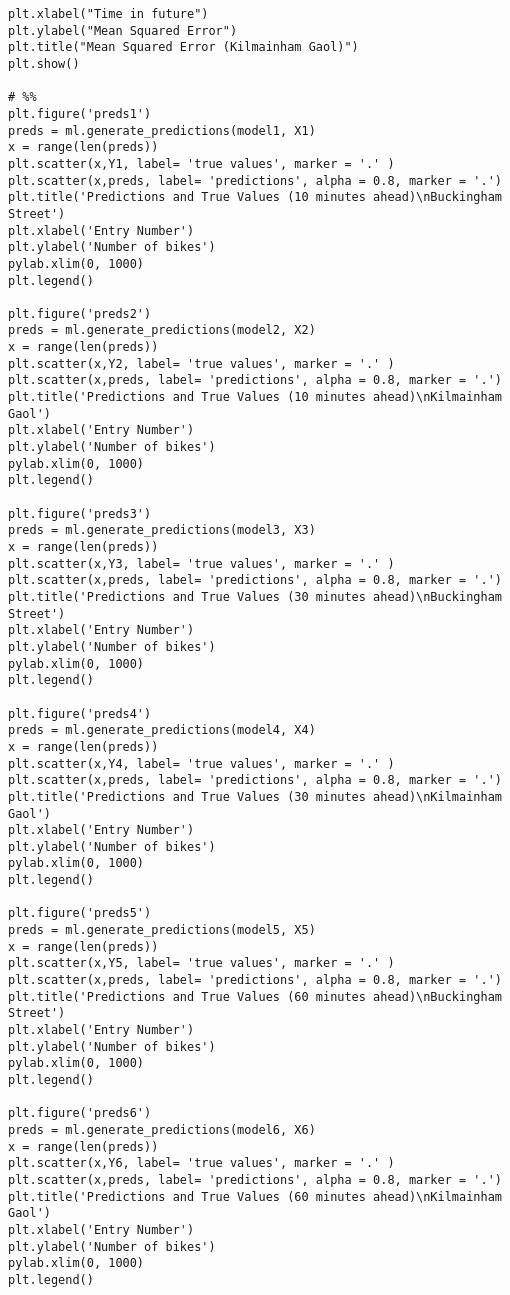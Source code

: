 \begin{verbatim}
plt.xlabel("Time in future")
plt.ylabel("Mean Squared Error")
plt.title("Mean Squared Error (Kilmainham Gaol)")
plt.show()

# %%
plt.figure('preds1')
preds = ml.generate_predictions(model1, X1)
x = range(len(preds))
plt.scatter(x,Y1, label= 'true values', marker = '.' )
plt.scatter(x,preds, label= 'predictions', alpha = 0.8, marker = '.')
plt.title('Predictions and True Values (10 minutes ahead)\nBuckingham Street')
plt.xlabel('Entry Number')
plt.ylabel('Number of bikes')
pylab.xlim(0, 1000)
plt.legend()

plt.figure('preds2')
preds = ml.generate_predictions(model2, X2)
x = range(len(preds))
plt.scatter(x,Y2, label= 'true values', marker = '.' )
plt.scatter(x,preds, label= 'predictions', alpha = 0.8, marker = '.')
plt.title('Predictions and True Values (10 minutes ahead)\nKilmainham Gaol')
plt.xlabel('Entry Number')
plt.ylabel('Number of bikes')
pylab.xlim(0, 1000)
plt.legend()

plt.figure('preds3')
preds = ml.generate_predictions(model3, X3)
x = range(len(preds))
plt.scatter(x,Y3, label= 'true values', marker = '.' )
plt.scatter(x,preds, label= 'predictions', alpha = 0.8, marker = '.')
plt.title('Predictions and True Values (30 minutes ahead)\nBuckingham Street')
plt.xlabel('Entry Number')
plt.ylabel('Number of bikes')
pylab.xlim(0, 1000)
plt.legend()

plt.figure('preds4')
preds = ml.generate_predictions(model4, X4)
x = range(len(preds))
plt.scatter(x,Y4, label= 'true values', marker = '.' )
plt.scatter(x,preds, label= 'predictions', alpha = 0.8, marker = '.')
plt.title('Predictions and True Values (30 minutes ahead)\nKilmainham Gaol')
plt.xlabel('Entry Number')
plt.ylabel('Number of bikes')
pylab.xlim(0, 1000)
plt.legend()

plt.figure('preds5')
preds = ml.generate_predictions(model5, X5)
x = range(len(preds))
plt.scatter(x,Y5, label= 'true values', marker = '.' )
plt.scatter(x,preds, label= 'predictions', alpha = 0.8, marker = '.')
plt.title('Predictions and True Values (60 minutes ahead)\nBuckingham Street')
plt.xlabel('Entry Number')
plt.ylabel('Number of bikes')
pylab.xlim(0, 1000)
plt.legend()

plt.figure('preds6')
preds = ml.generate_predictions(model6, X6)
x = range(len(preds))
plt.scatter(x,Y6, label= 'true values', marker = '.' )
plt.scatter(x,preds, label= 'predictions', alpha = 0.8, marker = '.')
plt.title('Predictions and True Values (60 minutes ahead)\nKilmainham Gaol')
plt.xlabel('Entry Number')
plt.ylabel('Number of bikes')
pylab.xlim(0, 1000)
plt.legend()


\end{verbatim}
